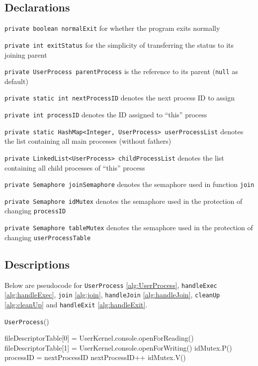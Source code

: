 \documentclass{article}
\begin{document}
\begin{spacing}{1.1}
\subsection{Declarations}
\texttt{private boolean normalExit} for whether the program exits normally

\texttt{private int exitStatus} for the simplicity of transferring the status to its joining parent

\texttt{private UserProcess parentProcess} is the reference to its parent (\texttt{null} as default)

\texttt{private static int nextProcessID} denotes the next process ID to assign

\texttt{private int processID} denotes the ID assigned to ``this'' process

\texttt{private static HashMap<Integer, UserProcess> userProcessList} denotes the list containing all main processes (without fathers)

\texttt{private LinkedList<UserProcess> childProcessList} denotes the list containing all child processes of ``this'' process

\texttt{private Semaphore joinSemaphore} denotes the semaphore used in function \texttt{join}

\texttt{private Semaphore idMutex} denotes the semaphore used in the protection of changing \texttt{processID}

\texttt{private Semaphore tableMutex} denotes the semaphore used in the protection of changing \linebreak \texttt{userProcessTable}
\subsection{Descriptions}
Below are pseudocode for \texttt{UserProcess} \ref{alg:UserProcess}, \texttt{handleExec} \ref{alg:handleExec}, \texttt{join} \ref{alg:join}, \texttt{handleJoin} \ref{alg:handleJoin}, \texttt{cleanUp} \ref{alg:cleanUp} and \texttt{handleExit} \ref{alg:handleExit}.
\begin{algorithm}[htbp]
  \label{alg:UserProcess}
\caption{\texttt{UserProcess}()}
  \begin{algorithmic}[1]
    \State fileDescriptorTable[0] = UserKernel.console.openForReading()
    \State fileDescriptorTable[1] = UserKernel.console.openForWriting()
    \State \colorbox{myyellow}{idMutex.P()}
	\State processID = nextProcessID
	\State nextProcessID++
	\State \colorbox{myyellow}{idMutex.V()}
  \end{algorithmic}
\end{algorithm}


\end{spacing}
\end{document}
